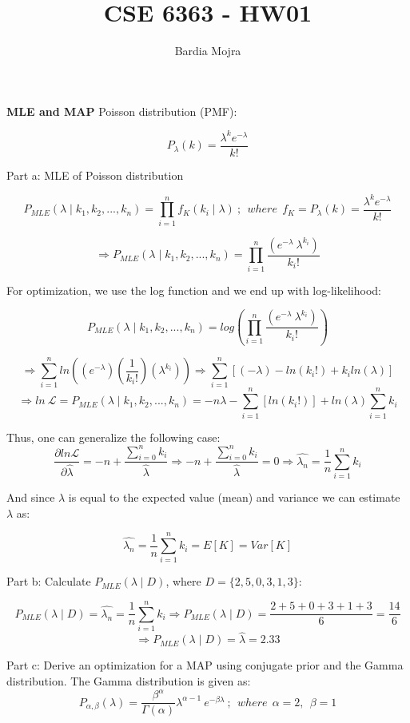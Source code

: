\documentclass{homeworg}
\title{CSE 6363 - HW01}
\author{Bardia Mojra}
\begin{document}
\maketitle

\exercise
\textbf{MLE and MAP}
\newline
Poisson distribution (PMF):

$$
P_{\lambda}(k) = \frac{\lambda^{k} e^{- \lambda}}{k!}
$$

Part a: MLE of Poisson distribution

$$
P_{MLE}(\lambda \mid k_1, k_2, ..., k_n) = \prod_{i = 1}^{n}f_K(k_i \mid \lambda)~
; ~~ where ~~ f_K = P_{\lambda}(k) = \frac{\lambda^{k} e^{- \lambda}}{k!}
$$

$$
\Rightarrow P_{MLE}(\lambda \mid k_1, k_2, ..., k_n) =  \prod_{i = 1}^{n}
\frac{(e^{- \lambda}~\lambda^{k_i})}{k_i!}
$$

For optimization, we use the log function and we end up with log-likelihood:

$$
P_{MLE}(\lambda \mid k_1, k_2, ..., k_n) =  log (\prod_{i = 1}^{n}
\frac{(e^{- \lambda}~\lambda^{k_i})}{k_i!} )
$$

$$
\Rightarrow \sum_{i=1}^{n} ln((e^{- \lambda})(\frac{1}{k_i!})(\lambda^{k_i}))
\Rightarrow \sum_{i=1}^{n}[ (- \lambda) - ln(k_i!) + k_i ln(\lambda)]
$$
$$
\Rightarrow ln ~\mathcal{L} =
P_{MLE}(\lambda \mid k_1, k_2, ..., k_n) =
-n\lambda - \sum_{i=1}^{n}[ln(k_i!)] + ln(\lambda)\sum_{i=1}^{n}k_i
$$

Thus, one can generalize the following case:
$$
\frac{\partial ln \mathcal{L} }{\partial \hat{\lambda}}
= -n + \frac{\sum_{i=0}^{n} k_i }{\hat{\lambda}}
\Rightarrow -n + \frac{\sum_{i=0}^{n} k_i }{\hat{\lambda}} = 0
\Rightarrow
\hat{\lambda_n} = \frac{1}{n} \sum_{i=1}^{n} k_i
$$

And since $\lambda$ is equal to the expected value (mean) and variance we can
estimate $\lambda$ as:

$$
\hat{\lambda_n} = \frac{1}{n} \sum_{i=1}^{n} k_i = E[K]= Var[K]
$$

\newpage
Part b: Calculate $P_{MLE}(\lambda \mid D)$, where $D=\{2,5,0,3,1,3\}$:

$$
P_{MLE}(\lambda \mid D) = \hat{\lambda_n} = \frac{1}{n} \sum_{i=1}^{n} k_i
\Rightarrow P_{MLE}(\lambda \mid D) = \frac{2+5+0+3+1+3}{6} = \frac{14}{6}
$$
$$
\Rightarrow
P_{MLE}(\lambda \mid D)
= \hat{\lambda} = 2.33
$$

Part c: Derive an optimization for a MAP using conjugate prior and the Gamma
distribution. The Gamma distribution is given as:
$$
P_{\alpha, \beta}(\lambda) = \frac{\beta^{\alpha}}{\Gamma(\alpha)} \lambda^{\alpha - 1}~e^{- \beta \lambda}
~;~~where ~~\alpha= 2, ~~\beta=1
$$
\end{document}
